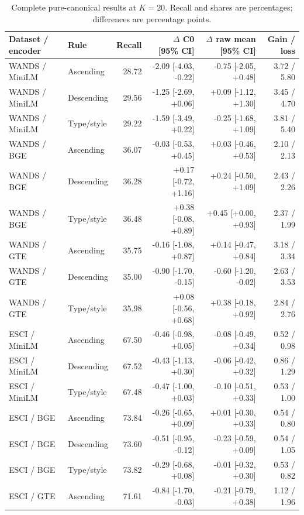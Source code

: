 \begin{table}[t]
\centering
\small
\setlength{\tabcolsep}{4pt}
\caption{Complete pure-canonical results at $K=20$. Recall and shares are percentages; differences are percentage points.}
\label{tab:canonical_intervals20}
\begin{tabular}{llrrrr}
\toprule
Dataset / encoder & Rule & Recall & $\Delta$ C0 [95\% CI] & $\Delta$ raw mean [95\% CI] & Gain / loss \\
\midrule
WANDS / MiniLM & Ascending & 28.72 & -2.09 [-4.03, -0.22] & -0.75 [-2.05, +0.48] & 3.72 / 5.80 \\
WANDS / MiniLM & Descending & 29.56 & -1.25 [-2.69, +0.06] & +0.09 [-1.12, +1.30] & 3.45 / 4.70 \\
WANDS / MiniLM & Type/style & 29.22 & -1.59 [-3.49, +0.22] & -0.25 [-1.68, +1.09] & 3.81 / 5.40 \\
WANDS / BGE & Ascending & 36.07 & -0.03 [-0.53, +0.45] & +0.03 [-0.46, +0.53] & 2.10 / 2.13 \\
WANDS / BGE & Descending & 36.28 & +0.17 [-0.72, +1.16] & +0.24 [-0.50, +1.09] & 2.43 / 2.26 \\
WANDS / BGE & Type/style & 36.48 & +0.38 [-0.08, +0.89] & +0.45 [+0.00, +0.93] & 2.37 / 1.99 \\
WANDS / GTE & Ascending & 35.75 & -0.16 [-1.08, +0.87] & +0.14 [-0.47, +0.84] & 3.18 / 3.34 \\
WANDS / GTE & Descending & 35.00 & -0.90 [-1.70, -0.15] & -0.60 [-1.20, -0.02] & 2.63 / 3.53 \\
WANDS / GTE & Type/style & 35.98 & +0.08 [-0.56, +0.68] & +0.38 [-0.18, +0.92] & 2.84 / 2.76 \\
ESCI / MiniLM & Ascending & 67.50 & -0.46 [-0.98, +0.05] & -0.08 [-0.49, +0.34] & 0.52 / 0.98 \\
ESCI / MiniLM & Descending & 67.52 & -0.43 [-1.13, +0.30] & -0.06 [-0.42, +0.32] & 0.86 / 1.29 \\
ESCI / MiniLM & Type/style & 67.48 & -0.47 [-1.00, +0.03] & -0.10 [-0.51, +0.33] & 0.53 / 1.00 \\
ESCI / BGE & Ascending & 73.84 & -0.26 [-0.65, +0.09] & +0.01 [-0.30, +0.33] & 0.54 / 0.80 \\
ESCI / BGE & Descending & 73.60 & -0.51 [-0.95, -0.12] & -0.23 [-0.59, +0.09] & 0.54 / 1.05 \\
ESCI / BGE & Type/style & 73.82 & -0.29 [-0.68, +0.08] & -0.01 [-0.32, +0.30] & 0.53 / 0.82 \\
ESCI / GTE & Ascending & 71.61 & -0.84 [-1.70, -0.03] & -0.21 [-0.79, +0.38] & 1.12 / 1.96 \\

\end{tabular}
\end{table}
